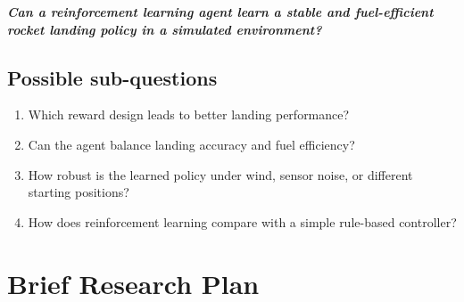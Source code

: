 \documentclass[11pt,a4paper]{article}
\begin{document}
\noindent\textit{\textbf{Can a reinforcement learning agent learn a stable and fuel-efficient rocket landing policy in a simulated environment?}}

\subsection*{Possible sub-questions}
\begin{enumerate}
    \item Which reward design leads to better landing performance?
    \item Can the agent balance landing accuracy and fuel efficiency?
    \item How robust is the learned policy under wind, sensor noise, or different starting positions?
    \item How does reinforcement learning compare with a simple rule-based controller?
\end{enumerate}

\section{Brief Research Plan}
\end{document}
